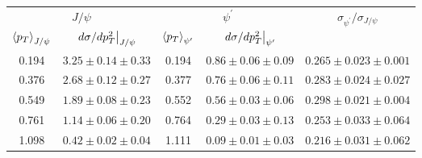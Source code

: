 \begin{tabular}{cc|cc|c}
\hline
\multicolumn{2}{c|}{$J/\psi$}                     & \multicolumn{2}{c|}{$\psi^{\prime}$}              & \multirow{2}{*}{$\sigma_{\psi^\prime}/\sigma_{J/\psi}$} \\ \cline{1-4}
$\expval{p_T}_{J/\psi}$ & $\eval{d\sigma/dp^2_T}_{J/\psi}$ & $\expval{p_T}_{\psi^\prime}$ & $\eval{d\sigma/dp^2_T}_{\psi^\prime}$ &  \\ \hline
\multicolumn{1}{c|}{0.194} & $3.25\pm0.14\pm0.33$ & \multicolumn{1}{c|}{0.194} & $0.86\pm0.06\pm0.09$ & $0.265\pm0.023\pm0.001$                                 \\
\multicolumn{1}{c|}{0.376} & $2.68\pm0.12\pm0.27$ & \multicolumn{1}{c|}{0.377} & $0.76\pm0.06\pm0.11$ & $0.283\pm0.024\pm0.027$                                 \\
\multicolumn{1}{c|}{0.549} & $1.89\pm0.08\pm0.23$ & \multicolumn{1}{c|}{0.552} & $0.56\pm0.03\pm0.06$ & $0.298\pm0.021\pm0.004$                                 \\
\multicolumn{1}{c|}{0.761} & $1.14\pm0.06\pm0.20$ & \multicolumn{1}{c|}{0.764} & $0.29\pm0.03\pm0.13$ & $0.253\pm0.033\pm0.064$                                 \\
\multicolumn{1}{c|}{1.098} & $0.42\pm0.02\pm0.04$ & \multicolumn{1}{c|}{1.111} & $0.09\pm0.01\pm0.03$ & $0.216\pm0.031\pm0.062$                                 \\ \hline
\end{tabular}
